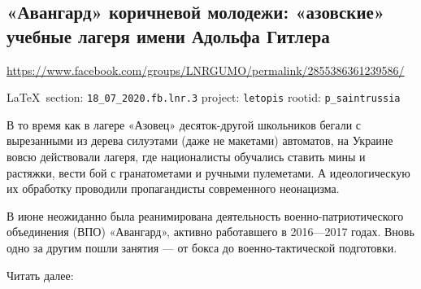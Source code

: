  
 
\subsection{«Авангард» коричневой молодежи: «азовские» учебные лагеря имени Адольфа Гитлера}
\label{sec:18_07_2020.fb.lnr.3}
\url{https://www.facebook.com/groups/LNRGUMO/permalink/2855386361239586/}
  
\vspace{0.5cm}
{\small\LaTeX~section: \verb|18_07_2020.fb.lnr.3| project: \verb|letopis| rootid: \verb|p_saintrussia|}
\vspace{0.5cm}
 
В то время как в лагере «Азовец» десяток-другой школьников бегали с вырезанными
из дерева силуэтами (даже не макетами) автоматов, на Украине вовсю действовали
лагеря, где националисты обучались ставить мины и растяжки, вести бой с
гранатометами и ручными пулеметами.  А идеологическую их обработку проводили
пропагандисты современного неонацизма.

В июне неожиданно была реанимирована деятельность военно-патриотического
объединения (ВПО) «Авангард», активно работавшего в 2016—2017 годах.  Вновь
одно за другим пошли занятия — от бокса до военно-тактической подготовки.

Читать далее: 
